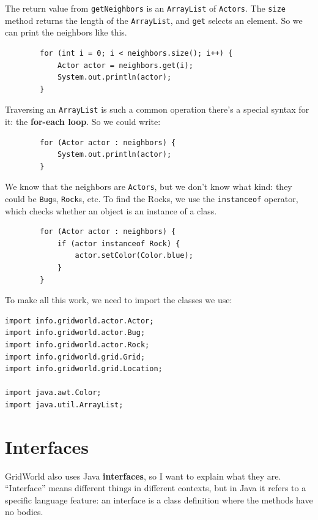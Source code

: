 The return value from {\tt getNeighbors} is an {\tt ArrayList}
of {\tt Actors}.  The {\tt size} method returns the length of
the {\tt ArrayList}, and {\tt get} selects an element.  So
we can print the neighbors like this.

\begin{lstlisting}
        for (int i = 0; i < neighbors.size(); i++) {
            Actor actor = neighbors.get(i);
            System.out.println(actor);
        }
\end{lstlisting}

Traversing an {\tt ArrayList} is such a common operation there's a
special syntax for it: the {\bf for-each loop}.  So we could write:

\begin{lstlisting}
        for (Actor actor : neighbors) {
            System.out.println(actor);
        }
\end{lstlisting}

We know that the neighbors are {\tt Actors}, but we don't know
what kind: they could be {\tt Bug}s, {\tt Rock}s, etc.
To find the Rocks, we use the {\tt instanceof} operator, which
checks whether an object is an instance of a class.

\begin{lstlisting}
        for (Actor actor : neighbors) {
            if (actor instanceof Rock) {
                actor.setColor(Color.blue);
            }
        }
\end{lstlisting}

To make all this work, we need to import the classes we use:

\begin{lstlisting}
import info.gridworld.actor.Actor;
import info.gridworld.actor.Bug;
import info.gridworld.actor.Rock;
import info.gridworld.grid.Grid;
import info.gridworld.grid.Location;

import java.awt.Color;
import java.util.ArrayList;
\end{lstlisting}


\section{Interfaces}

GridWorld also uses Java {\bf interfaces}, so I want to explain what
they are.  ``Interface'' means different things in different contexts,
but in Java it refers to a specific language feature:
an interface is a class definition where the methods have no bodies.

